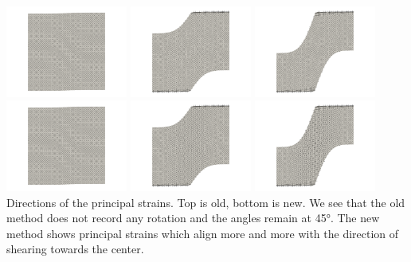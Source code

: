 \begin{center}
\includegraphics[width=4cm]{python_codes/fieldstone_89/results/shearband/old_dirs0000}
\includegraphics[width=4cm]{python_codes/fieldstone_89/results/shearband/old_dirs0005}
\includegraphics[width=4cm]{python_codes/fieldstone_89/results/shearband/old_dirs0010}\\
\includegraphics[width=4cm]{python_codes/fieldstone_89/results/shearband/new_dirs0000}
\includegraphics[width=4cm]{python_codes/fieldstone_89/results/shearband/new_dirs0005}
\includegraphics[width=4cm]{python_codes/fieldstone_89/results/shearband/new_dirs0010}\\
{\captionfont Directions of the principal strains. Top is old, bottom is new. We see that 
the old method does not record any rotation and the angles remain at 45\si{\degree}. 
The new method shows principal strains which align more and more with the direction 
of shearing towards the center.}
\end{center}


